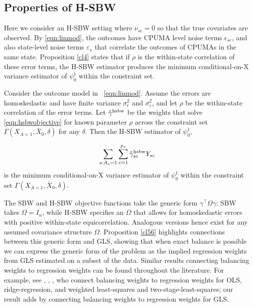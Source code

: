 \subsection{Properties of H-SBW}\label{app:AsecII}

Here we consider an H-SBW setting where $\nu_{sc}=0$ so that the true covariates are observed. By \eqref{eqn:linmod}, the outcomes have CPUMA level noise terms  $\epsilon_{sc}$, and also state-level noise terms $\varepsilon_s$ that correlate the outcomes of CPUMAs in the same state. Proposition \ref{cl4} states that if $\rho$ is the within-state correlation of these error terms, the H-SBW estimator produces the minimum conditional-on-X variance estimator of $\psi_0^1$ within the constraint set.

\begin{proposition}\label{cl4}
    Consider the outcome model in ~\eqref{eqn:linmod}. Assume the errors are homoskedastic and have finite variance $\sigma^2_{\epsilon}$ and $\sigma^2_{\varepsilon}$, and let $\rho$ be the within-state correlation of the error terms. Let $\hat{\gamma}^{\textup{hsbw}}$ be the weights that solve \eqref{eqn:hsbwobjective} for known parameter $\rho$ across the constraint set $\Gamma(X_{A=1}, \bar{X}_0, \delta)$ for any $\delta$. Then the H-SBW estimator of $\psi_0^1$,

    \[\sum_{s: A_s = 1}\sum_{c=1}^{p_s}\hat{\gamma}_{sc}^{\textup{hsbw}}Y_{sc}\] 
    is the minimum conditional-on-X variance estimator of $\psi_0^1$ within the constraint set $\Gamma(X_{A=1}, \bar{X}_0, \delta)$.
\end{proposition}

The SBW and H-SBW objective functions take the generic form $\gamma^\top\Omega\gamma$: SBW takes $\Omega = I_n$, while H-SBW specifies an $\Omega$ that allows for homoskedastic errors with positive within-state equicorrelation. Analogous versions hence exist for any assumed covariance structure $\Omega$. Proposition \ref{cl56} highlights connections between this generic form and GLS, showing that when exact balance is possible we can express the generic form of the problem as the implied regression weights from GLS estimated on a subset of the data. Similar results connecting balancing weights to regression weights can be found throughout the literature. For example, see \citet{kline2011oaxaca}, \citet{ben2021augmented}, \citet{chattopadhyay2021implied}, who connect balancing weights to regression weights for OLS, ridge-regression, and weighted least-squares and two-stage-least-squares; our result adds by connecting balancing weights to regression weights for GLS.

